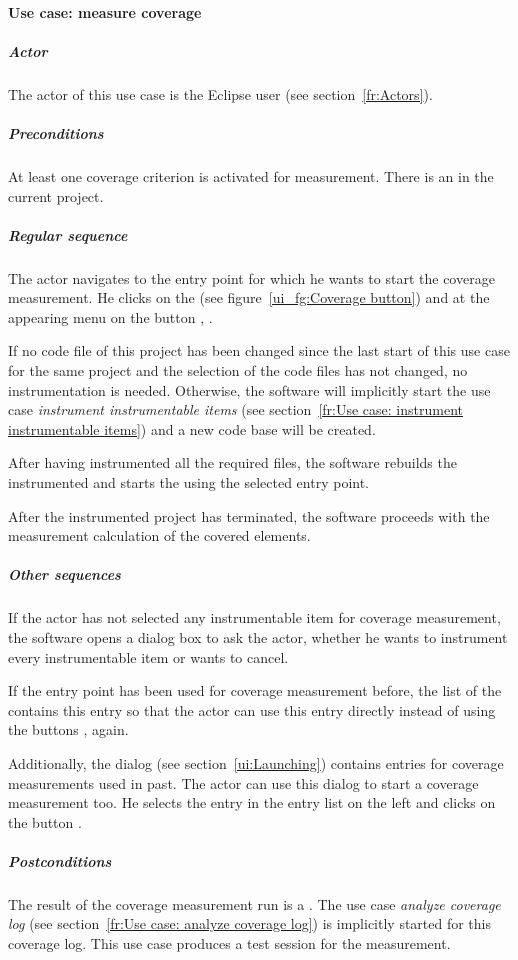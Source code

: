 \paragraph{Use case: measure coverage} \label{fr:Use case: measure coverage}
\subparagraph{Actor}
The actor of this use case is the Eclipse user (see section~\ref{fr:Actors}).
\subparagraph{Preconditions}
At least one coverage criterion is activated for measurement. There is an  in the current project.
\subparagraph{Regular sequence}
The actor navigates to the entry point for which he wants to start the coverage measurement. He clicks on the  (see figure~\ref{ui_fg:Coverage button}) and at the appearing menu on the button , .
\par
If no code file of this project has been changed since the last start of this use case for the same project and the selection of the code files  has not changed, no instrumentation is needed. Otherwise, the software will implicitly start the use case \textit{instrument instrumentable items} (see section~\ref{fr:Use case: instrument instrumentable items}) and a new code base will be created.
\par
After having instrumented all the required files, the software rebuilds the instrumented  and starts the  using the selected entry point.
\par
After the instrumented project has terminated, the software proceeds with the measurement calculation of the covered elements.
\subparagraph{Other sequences}
If the actor has not selected any instrumentable item for coverage measurement, the software opens a dialog box to ask the actor, whether he wants to instrument every instrumentable item or wants to cancel.
\par
If the entry point has been used for coverage measurement before, the list of the  contains this entry so that the actor can use this entry directly instead of using the buttons ,  again.
\par
Additionally, the  dialog (see section~\ref{ui:Launching}) contains entries for coverage measurements used in past. The actor can use this dialog to start a coverage measurement too. He selects the entry in the entry list on the left and clicks on the button .
\subparagraph{Postconditions}
The result of the coverage measurement run is a . The use case \textit{analyze coverage log} (see section~\ref{fr:Use case: analyze coverage log}) is implicitly started for this coverage log. This use case produces a test session for the measurement.
